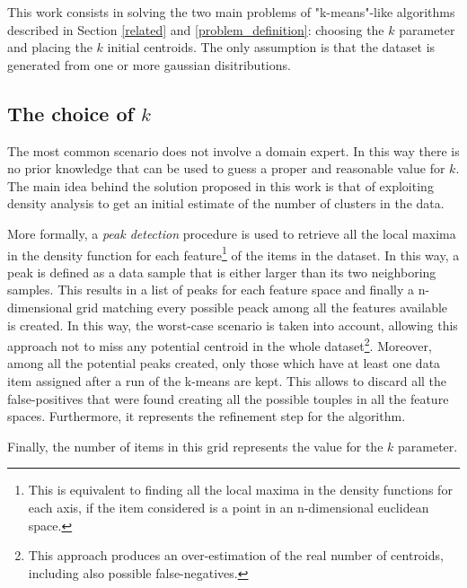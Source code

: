This work consists in solving the two main problems of "k-means"-like 
algorithms described in Section \ref{related} and \ref{problem_definition}:
choosing the $k$ parameter and placing the $k$ initial centroids.
The only assumption is that the dataset is generated from one or more gaussian
disitributions.


\subsection*{The choice of $k$}
The most common scenario does not involve a domain expert. In this way there is 
no prior knowledge that can be used to guess a proper and reasonable value for $k$.
The main idea behind the solution proposed in this work is that of exploiting density
analysis to get an initial estimate of the number of clusters in the data.

More formally, a \emph{peak detection} procedure is used to retrieve all the local
maxima in the density function for each feature\footnote{This is equivalent to finding 
all the local maxima in the density functions for each axis, if the item considered is
a point in an n-dimensional euclidean space.} of the items in the dataset. In this way,
a peak is defined as a data sample that is either larger than its two neighboring samples.
This results in a list of peaks for each feature space and finally a n-dimensional grid
matching every possible peack among all the features available is created.
In this way, the worst-case scenario is taken into account, allowing this approach not
to miss any potential centroid in the whole dataset\footnote{This approach produces an 
over-estimation of the real number of centroids, including also possible false-negatives.}.
Moreover, among all the potential peaks created, only those which have at least one data
item assigned after a run of the k-means are kept. This allows to discard all the 
false-positives that were found creating all the possible touples in all the feature spaces.
Furthermore, it represents the refinement step for the algorithm.

Finally, the number of items in this grid represents the value for the $k$ parameter.


